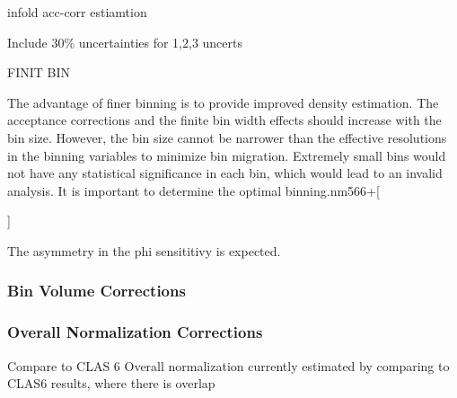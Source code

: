     infold acc-corr estiamtion

    Include 30\% uncertainties for 1,2,3 uncerts

    FINIT BIN

    The advantage of finer binning is to provide improved density estimation. The
acceptance corrections and the finite bin width effects should increase with the bin
size. However, the bin size cannot be narrower than the effective resolutions in the
binning variables to minimize bin migration. Extremely small bins would not have
any statistical significance in each bin, which would lead to an invalid analysis. It is
important to determine the optimal binning.nm566+[



]
    

    The asymmetry in the phi sensititivy is expected. 
    
    
    \subsubsection*{Bin Volume Corrections}
        
    
    \subsubsection*{Overall Normalization Corrections}
        Compare to CLAS 6
        Overall normalization currently estimated by comparing to CLAS6 results, where there is overlap
    \fi

